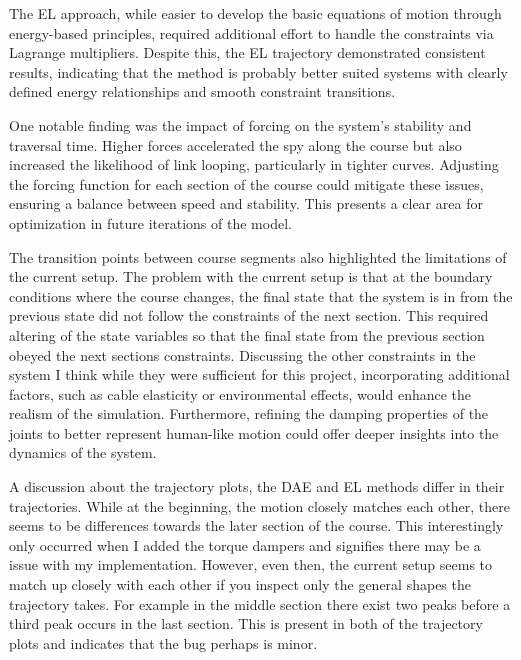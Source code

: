 \documentclass{article}
\begin{document}
The EL approach, while easier to develop the basic equations of motion through energy-based principles, required additional effort to handle the constraints via Lagrange multipliers. Despite this, the EL trajectory demonstrated consistent results, indicating that the method is probably better suited systems with clearly defined energy relationships and smooth constraint transitions.

One notable finding was the impact of forcing on the system’s stability and traversal time. Higher forces accelerated the spy along the course but also increased the likelihood of link looping, particularly in tighter curves. Adjusting the forcing function for each section of the course could mitigate these issues, ensuring a balance between speed and stability. This presents a clear area for optimization in future iterations of the model.

The transition points between course segments also highlighted the limitations of the current setup. The problem with the current setup is that at the boundary conditions where the course changes, the final state that the system is in from the previous state did not follow the constraints of the next section. This required altering of the state variables so that the final state from the previous section obeyed the next sections constraints. Discussing the other constraints in the system I think while they were sufficient for this project, incorporating additional factors, such as cable elasticity or environmental effects, would enhance the realism of the simulation. Furthermore, refining the damping properties of the joints to better represent human-like motion could offer deeper insights into the dynamics of the system.

A discussion about the trajectory plots, the DAE and EL methods differ in their trajectories. While at the beginning, the motion closely matches each other, there seems to be differences towards the later section of the course. This interestingly only occurred when I added the torque dampers and signifies there may be a issue with my implementation. However, even then, the current setup seems to match up closely with each other if you inspect only the general shapes the trajectory takes. For example in the middle section there exist two peaks before a third peak occurs in the last section. This is present in both of the trajectory plots and indicates that the bug perhaps is minor. 
\end{document}
